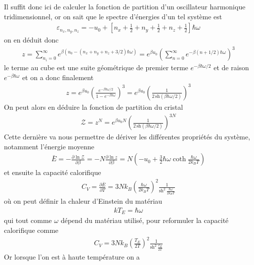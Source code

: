 \documentclass[12pt,prb,aps,epsf]{article}
\begin{document}
Il suffit donc ici de calculer la fonction de partition d'un oscillateur harmonique tridimensionnel, or on sait que le spectre d'énergies d'un tel système est 
\begin{eqnarray}
\varepsilon_{n_x,n_y,n_z} = -u_0 + \left[n_x +\frac{1}{2} +n_y +\frac{1}{2} + n_z +\frac{1}{2}\right]\hbar \omega
\end{eqnarray}
on en déduit donc 
\begin{eqnarray}
z = \sum_{n_i=0}^{\infty} e^{\beta (u_0 - (n_x+n_y+n_z+3/2)\hbar\omega)} = e^{\beta u_0} \left( \sum_{n=0}^{\infty} e^{-\beta(n+1/2)\hbar \omega}\right)^3
\end{eqnarray}
le terme au cube est une suite géométrique de premier terme $e^{-\beta\hbar\omega/2}$ et de raison $e^{-\beta \hbar \omega}$ et on a donc finalement
\begin{eqnarray}
z = e^{\beta u_0}\left(\frac{e^{-\beta \hbar \omega /2}}{1- e^{-\beta \hbar \omega}}\right)^3 = e^{\beta u_0}\left(\frac{1}{2\,\mathrm{sh} (\beta \hbar \omega /2)}\right)^3
\end{eqnarray}
On peut alors en déduire la fonction de partition du cristal 
\begin{eqnarray}
\mathcal{Z} = z^N = e^{\beta u_0 N}\left(\frac{1}{2\,\mathrm{sh} (\beta \hbar \omega /2)}\right)^{3N}
\end{eqnarray}
Cette dernière va nous permettre de dériver les différentes propriétés du système, notamment l'énergie moyenne 
\begin{eqnarray}
\bar{E}= -\frac{\partial \ln \mathcal{Z}}{\partial \beta} = -N\frac{\partial \ln z}{\partial \beta} = N\left(-u_0 + \frac{3}{2} \hbar \omega \coth \frac{\hbar \omega}{2k_B T}\right)
\end{eqnarray}
et ensuite la capacité calorifique
\begin{eqnarray}
C_V = \frac{\partial \bar{E}}{\partial T} = 3Nk_B\left(\frac{\hbar \omega}{2k_B T}\right)^2 \frac{1}{\mathrm{sh}^2\, \frac{\hbar \omega}{2k_BT}}
\end{eqnarray}
où on peut définir la chaleur d'Einstein du matériau 
\begin{eqnarray}
kT_E = \hbar \omega
\end{eqnarray}
qui tout comme $\omega$ dépend du matériau utilisé, pour reformuler la capacité calorifique comme 
\begin{eqnarray}
C_V = 3N k_B \left(\frac{T_E}{2T}\right)^2 \frac{1}{\mathrm{sh}^2\,\frac{T_E}{2T}}
\end{eqnarray}
Or lorsque l'on est à haute température on a 
\end{document}
